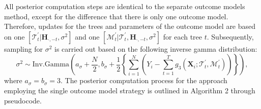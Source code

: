 All posterior computation steps are identical to the separate outcome models method, except for the difference that there is only one outcome model. Therefore, updates for the trees and parameters of the outcome model are based on one $[\mathcal{T}_t^\prime | \boldsymbol{H}_{\cdot, -t}, \sigma^2]$ and one $[\mathcal{M}^\prime_t | \mathcal{T}_t^\prime, \boldsymbol{H}_{\cdot, -t}, \sigma^2]$ for each tree $t$. Subsequently, sampling for $\sigma^2$ is carried out based on the following inverse gamma distribution:
\[\sigma^2 \sim \text{Inv.Gamma}\left(a_\sigma+\frac{N}{2}, b_\sigma+\frac{1}{2}\left\{\sum_{i=1}^{N} \left(Y_i - \sum_{t=1}^T g_3(\boldsymbol{X}_i; \mathcal{T}_t^\prime, \mathcal{M}_t^\prime)\right) \right\}\right),\]
where $a_\sigma=b_\sigma=3$. The posterior computation process for the approach employing the single outcome model strategy is outlined in Algorithm 2 through pseudocode.
